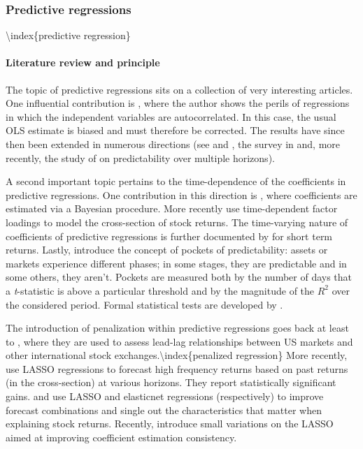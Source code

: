 \subsubsection{Predictive regressions}

{\textbackslash}index\{predictive regression\}

\paragraph{Literature review and principle}

The topic of predictive regressions sits on a collection of very interesting articles. One influential contribution is \cite{stambaugh1999predictive}, where the author shows the perils of regressions in which the independent variables are autocorrelated. In this case, the usual OLS estimate is biased and must therefore be corrected. The results have since then been extended in numerous directions (see \cite{campbell2006efficient} and \cite{hjalmarsson2011new}, the survey in \cite{gonzalo2018predictive} and, more recently, the study of \cite{xu2020testing} on predictability over multiple horizons).

A second important topic pertains to the time-dependence of the coefficients in predictive regressions. One contribution in this direction is \cite{dangl2012predictive}, where coefficients are estimated via a Bayesian procedure. More recently \cite{kelly2019characteristics} use time-dependent factor loadings to model the cross-section of stock returns. The time-varying nature of coefficients of predictive regressions is further documented by \cite{henkel2011time} for short term returns. Lastly, \cite{farmer2019pockets} introduce the concept of pockets of predictability: assets or markets experience different phases; in some stages, they are predictable and in some others, they aren't. Pockets are measured both by the number of days that a \textit{t}-statistic is above a particular threshold and by the magnitude of the $R^2$ over the considered period. Formal statistical tests are developed by \cite{demetrescu2020testing}.

The introduction of penalization within predictive regressions goes back at least to \cite{rapach2013international}, where they are used to assess lead-lag relationships between US markets and other international stock exchanges.{\textbackslash}index\{penalized regression\} More recently, \cite{chinco2019sparse} use LASSO regressions to forecast high frequency returns based on past returns (in the cross-section) at various horizons. They report statistically significant gains. \cite{han2018firm} and \cite{rapach2019time} use LASSO and elasticnet regressions (respectively) to improve forecast combinations and single out the characteristics that matter when explaining stock returns. Recently, \cite{lee2022lasso} introduce small variations on the LASSO aimed at improving coefficient estimation consistency.

